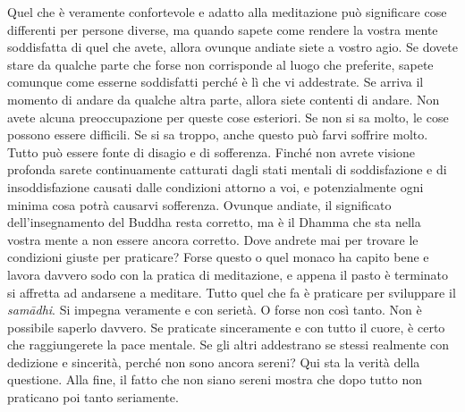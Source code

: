 Quel che è veramente confortevole e adatto alla meditazione può
significare cose differenti per persone diverse, ma quando sapete come
rendere la vostra mente soddisfatta di quel che avete, allora ovunque
andiate siete a vostro agio. Se dovete stare da qualche parte che forse
non corrisponde al luogo che preferite, sapete comunque come esserne
soddisfatti perché è lì che vi addestrate. Se arriva il momento di
andare da qualche altra parte, allora siete contenti di andare. Non
avete alcuna preoccupazione per queste cose esteriori. Se non si sa
molto, le cose possono essere difficili. Se si sa troppo, anche questo
può farvi soffrire molto. Tutto può essere fonte di disagio e di
sofferenza. Finché non avrete visione profonda sarete continuamente
catturati dagli stati mentali di soddisfazione e di insoddisfazione
causati dalle condizioni attorno a voi, e potenzialmente ogni minima
cosa potrà causarvi sofferenza. Ovunque andiate, il significato
dell'insegnamento del Buddha resta corretto, ma è il Dhamma che sta
nella vostra mente a non essere ancora corretto. Dove andrete mai per
trovare le condizioni giuste per praticare? Forse questo o quel monaco
ha capito bene e lavora davvero sodo con la pratica di meditazione, e
appena il pasto è terminato si affretta ad andarsene a meditare. Tutto
quel che fa è praticare per sviluppare il \emph{samādhi}. Si impegna
veramente e con serietà. O forse non così tanto. Non è possibile saperlo
davvero. Se praticate sinceramente e con tutto il cuore, è certo che
raggiungerete la pace mentale. Se gli altri addestrano se stessi
realmente con dedizione e sincerità, perché non sono ancora sereni? Qui
sta la verità della questione. Alla fine, il fatto che non siano sereni
mostra che dopo tutto non praticano poi tanto seriamente.

